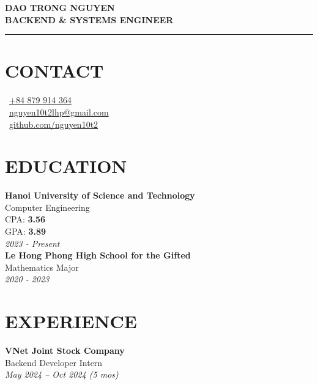 \documentclass[10pt,a4paper]{article}
\begin{document}
\begin{center}
    {\LARGE \textbf{\color{primary} DAO TRONG NGUYEN}} \\[3pt]
    {\large \textbf{\color{gray} BACKEND \& SYSTEMS ENGINEER}}
\end{center}
\vspace{0.1cm}
{\color{lightgray}\hrule}
\vspace{0.2cm}


\begin{minipage}[t]{0.30\textwidth}

    \section*{CONTACT}
    \faPhone\ \href{tel:+84879914364}{+84 879 914 364} \\[4pt]
    \faEnvelope\ \href{mailto:nguyen10t2lhp@gmail.com}{nguyen10t2lhp@gmail.com} \\[4pt]
    \faGithub\ \href{https://github.com/nguyen10t2}{github.com/nguyen10t2}

    \vspace{0.25cm}
    \section*{EDUCATION}
    \textbf{Hanoi University of Science and Technology} \\
    Computer Engineering \\
    CPA: \textbf{3.56} \\
    GPA: \textbf{3.89} \\
    \textit{\color{gray} 2023 - Present} \\[0.25cm]
    \textbf{Le Hong Phong High School for the Gifted} \\
    Mathematics Major \\
    \textit{\color{gray} 2020 - 2023}

    \vspace{0.25cm}
    \section*{EXPERIENCE}
    \textbf{VNet Joint Stock Company} \\
    Backend Developer Intern \\
    \textit{\color{gray} May 2024 -- Oct 2024 (5 mos)}


\end{minipage}
\end{document}
